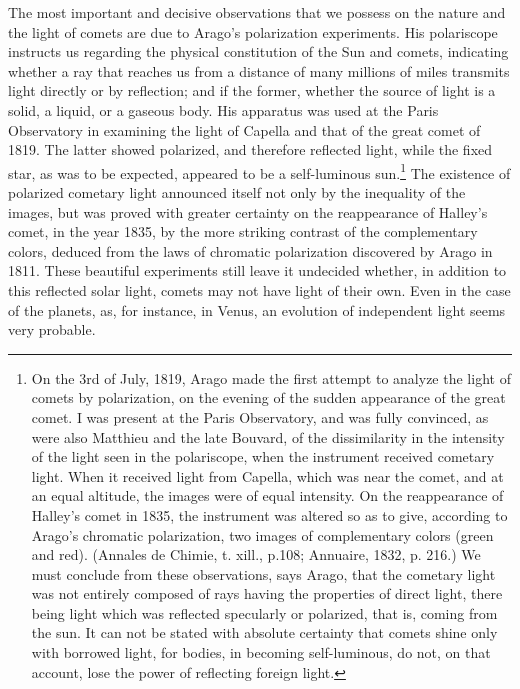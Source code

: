 The most important and decisive observations that we possess on the nature and the light of comets are due to Arago's polarization experiments. His polariscope instructs us regarding the physical constitution of the Sun and comets, indicating whether a ray that reaches us from a distance of many millions of miles transmits light directly or by reflection; and if the former, whether the source of light is a solid, a liquid, or a gaseous body. His apparatus was used at the Paris Observatory in examining the light of Capella and that of the great comet of 1819. The latter showed polarized, and therefore reflected light, while the fixed star, as was to be expected, appeared to be a self-luminous sun.\footnote{On the 3rd of July, 1819, Arago made the first attempt to analyze the light of comets by polarization, on the evening of the sudden appearance of the great comet. I was present at the Paris Observatory, and was fully convinced, as were also Matthieu and the late Bouvard, of the dissimilarity in the intensity of the light seen in the polariscope, when the instrument received cometary light. When it received light from Capella, which was near the comet, and at an equal altitude, the images were of equal intensity. On the reappearance of Halley's comet in 1835, the instrument was altered so as to give, according to Arago's chromatic polarization, two images of complementary colors (green and red). (Annales de Chimie, t. xill., p.108; Annuaire, 1832, p. 216.) We must conclude from these observations, says Arago, that the cometary light was not entirely composed of rays having the properties of direct light, there being light which was reflected specularly or polarized, that is, coming from the sun. It can not be stated with absolute certainty that comets shine only with borrowed light, for bodies, in becoming self-luminous, do not, on that account, lose the power of reflecting foreign light.} The existence of polarized cometary light announced itself not only by the inequality of the images, but was proved with greater certainty on the reappearance of Halley's comet, in the year 1835, by the more striking contrast of the complementary colors, deduced from the laws of chromatic polarization discovered by Arago in 1811. These beautiful experiments still leave it undecided whether, in addition to this reflected solar light, comets may not have light of their own. Even in the case of the planets, as, for instance, in Venus, an evolution of independent light seems very probable.

